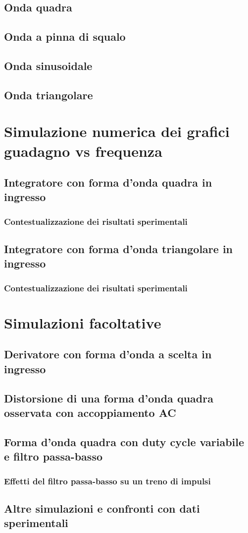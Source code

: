 \documentclass{article}
\begin{document}
    \subsection{Onda quadra}
    \subsection{Onda a pinna di squalo}
    \subsection{Onda sinusoidale}
    \subsection{Onda triangolare}



\section{Simulazione numerica dei grafici guadagno vs frequenza}
    \subsection{Integratore con forma d'onda quadra in ingresso}
        \subsubsection{Contestualizzazione dei risultati sperimentali}
    \subsection{Integratore con forma d'onda triangolare in ingresso}
        \subsubsection{Contestualizzazione dei risultati sperimentali}



\section{Simulazioni facoltative}
    \subsection{Derivatore con forma d'onda a scelta in ingresso}
    \subsection{Distorsione di una forma d'onda quadra osservata con accoppiamento AC}
    \subsection{Forma d'onda quadra con duty cycle variabile e filtro passa-basso}
        \subsubsection{Effetti del filtro passa-basso su un treno di impulsi}
    \subsection{Altre simulazioni e confronti con dati sperimentali}
\end{document}
